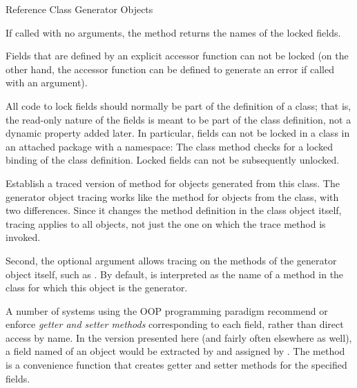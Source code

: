 \begin{Section}{Reference Class Generator Objects}
\begin{description}
If called with no arguments, the method returns the names of the
locked fields.

Fields that are defined by an explicit accessor function can not be
locked (on the other hand, the accessor function can be defined to
generate an error if called with an argument).

All code to lock fields should normally be part of the definition of a
class; that is, the read-only nature of the fields is meant to be part
of the class definition, not a dynamic property added later.
In particular, fields can not be locked in a class in an attached
package with a namespace:  The class method checks for a locked
binding of the class definition.  Locked fields can not be
subsequently unlocked.


\item[\code{\$trace(what, ..., classMethod = FALSE)}]  
Establish a traced version of method  for objects generated
from this class.  The generator object tracing works like the
method for objects from the class, with two differences.
Since it changes the method definition in the class object itself,
tracing applies to all objects, not just the one on which the trace
method is invoked.

Second, the optional argument  allows tracing
on the methods of the generator object itself, such as .
By default,  is interpreted as the name of a method in the
class for which this object is the generator.


\item[\code{\$accessors(...)}]  
A number of
systems using the OOP programming paradigm recommend or enforce
\emph{getter and setter methods}
corresponding to each field, rather than direct access by name.
In the \R{} version presented here (and fairly often elsewhere
as well), a field named  of an object  would be
extracted by  and assigned by
.
The  
method is a convenience function that creates getter and setter methods for the
specified fields.


\end{description}
 
\end{Section}
%
